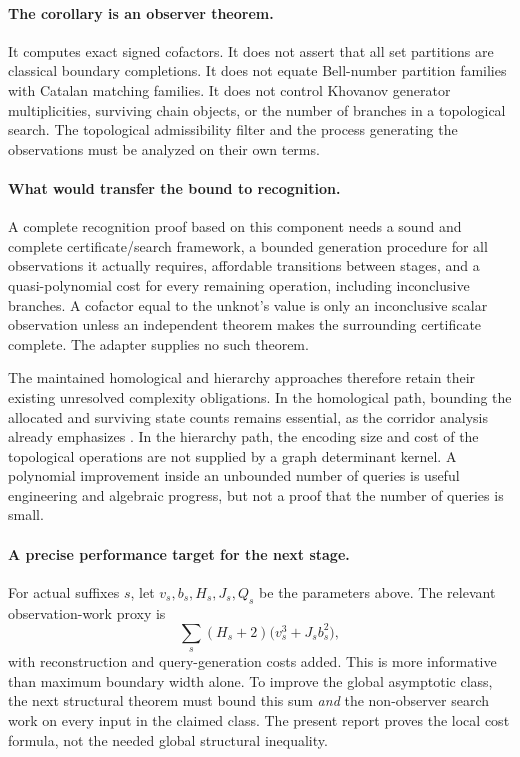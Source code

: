 \documentclass[11pt,letterpaper]{article}
\theoremstyle{definition}\newtheorem{definition}[theorem]{Definition}
\theoremstyle{remark}\newtheorem{remark}[theorem]{Remark}
\begin{document}
\paragraph{The corollary is an observer theorem.}
It computes exact signed cofactors. It does not assert that all set partitions are classical boundary completions. It does not equate Bell-number partition families with Catalan matching families. It does not control Khovanov generator multiplicities, surviving chain objects, or the number of branches in a topological search. The topological admissibility filter and the process generating the observations must be analyzed on their own terms.

\paragraph{What would transfer the bound to recognition.}
A complete recognition proof based on this component needs a sound and complete certificate/search framework, a bounded generation procedure for all observations it actually requires, affordable transitions between stages, and a quasi-polynomial cost for every remaining operation, including inconclusive branches. A cofactor equal to the unknot's value is only an inconclusive scalar observation unless an independent theorem makes the surrounding certificate complete. The adapter supplies no such theorem.

The maintained homological and hierarchy approaches therefore retain their existing unresolved complexity obligations. In the homological path, bounding the allocated and surviving state counts remains essential, as the corridor analysis already emphasizes \cite{corridor}. In the hierarchy path, the encoding size and cost of the topological operations are not supplied by a graph determinant kernel. A polynomial improvement inside an unbounded number of queries is useful engineering and algebraic progress, but not a proof that the number of queries is small.

\paragraph{A precise performance target for the next stage.}
For actual suffixes $s$, let $v_s,b_s,H_s,J_s,Q_s$ be the parameters above. The relevant observation-work proxy is
\[
 \sum_s (H_s+2)\bigl(v_s^3+J_sb_s^2\bigr),
\]
with reconstruction and query-generation costs added. This is more informative than maximum boundary width alone. To improve the global asymptotic class, the next structural theorem must bound this sum \emph{and} the non-observer search work on every input in the claimed class. The present report proves the local cost formula, not the needed global structural inequality.
\end{document}
